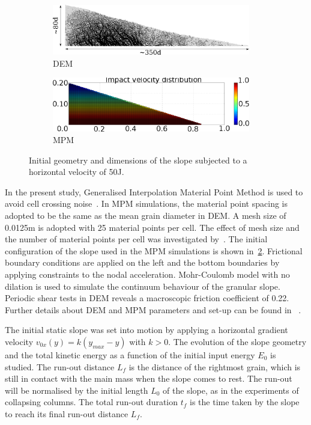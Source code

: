 \documentclass[3p,times,procedia,number]{elsarticle}
\begin{document}
\begin{figure}[tbhp]
  \centering
  \begin{subfigure}[b]{0.47\textwidth}
    \centering
    \includegraphics[width=0.95\textwidth]{figs/slope_configuration}
    \caption{DEM}
    \label{fig:dem_slope_configuration}
  \end{subfigure}
  \begin{subfigure}[b]{0.47\textwidth}
    \centering
    \includegraphics[width=0.95\textwidth]{figs/mpm_velocity_slope}
    \caption{MPM}
    \label{fig:mpm_slope_setup}
  \end{subfigure}
  \caption{Initial geometry and dimensions of the slope subjected to a horizontal 
    velocity of 50J.}
  \label{fig:slope_configuration}
\end{figure}


In the present study, Generalised Interpolation Material Point Method 
is used to avoid cell crossing noise~\citep{Steffen2008, Bardenhagen2004}.
In MPM simulations, the material point spacing is adopted to be the same as the 
mean grain diameter in DEM. A mesh size of 0.0125m is adopted with 25 material 
points per cell. The effect of mesh size and the number of material points per 
cell was investigated by~\citet{Soundararajan2015}. The initial configuration
of the slope used in the MPM simulations is shown in~\cref{fig:mpm_slope_setup}.
Frictional boundary conditions are applied on the left and the bottom boundaries
by applying constraints to the nodal acceleration. Mohr-Coulomb model with no
dilation is used to simulate the continuum behaviour of the granular slope.
Periodic shear tests in DEM reveals a macroscopic friction coefficient of 0.22.
Further details about DEM and MPM parameters and set-up can be found in
~\citet{Soundararajan2015}.

The initial static slope was set into motion by applying a horizontal
gradient velocity $v_{0x}(y) = k (y_{max} - y)$ with $k>0$. The evolution of 
the slope geometry and the total kinetic energy as a function of the initial 
input energy $E_0$ is studied. The run-out distance $L_f$ is the distance of 
the rightmost grain, which is still in contact with the main mass when the slope 
comes to rest. The run-out will be normalised by the initial length $L_0$ of 
the slope, as in the experiments of collapsing columns. The total run-out 
duration $t_f$ is the time taken by the slope to reach its final run-out 
distance $L_f$.
\end{document}
